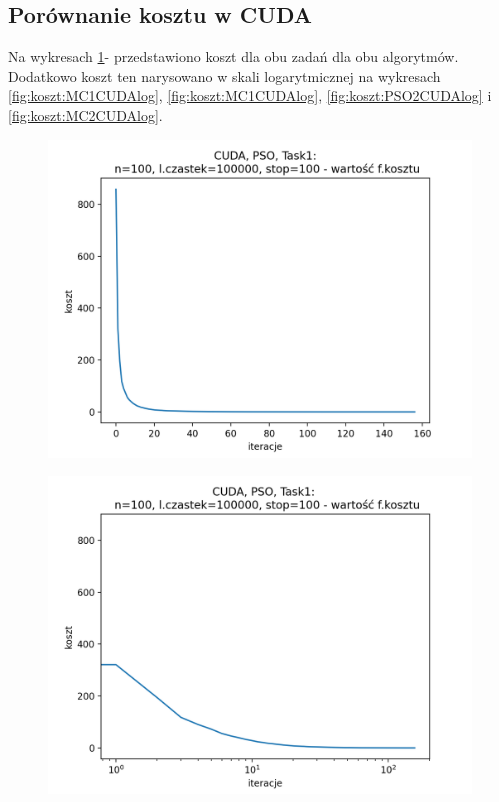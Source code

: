 \documentclass[11pt, a4paper, oneside]{article}
\begin{document}
\subsection{Porównanie kosztu w CUDA} \label{sec:CUDA2}

Na wykresach \ref{fig:koszt:PSO1CUDAlog}-\label{fig:koszt:MC2CUDAlog} przedstawiono koszt dla obu zadań dla obu algorytmów. Dodatkowo koszt ten narysowano w skali logarytmicznej na wykresach \ref{fig:koszt:MC1CUDAlog}, \ref{fig:koszt:MC1CUDAlog}, \ref{fig:koszt:PSO2CUDAlog} i \ref{fig:koszt:MC2CUDAlog}.

\begin{figure}[H]
\centering
\begin{minipage}[b]{\dimexpr.5\textwidth-1em}
  \centering
  \includegraphics[width=1\linewidth]{grafiki2/CUDA/CUDA_PSO_Task1_koszt_linear.png}
  \label{fig:koszt:PSO1CUDA}
\end{minipage} \hfill
\begin{minipage}[b]{\dimexpr.5\textwidth-1em}
  \centering
  \includegraphics[width=1\linewidth]{grafiki2/CUDA/CUDA_PSO_Task1_koszt_log.png}
  \label{fig:koszt:PSO1CUDAlog}
\end{minipage}
\end{figure}
\end{document}
